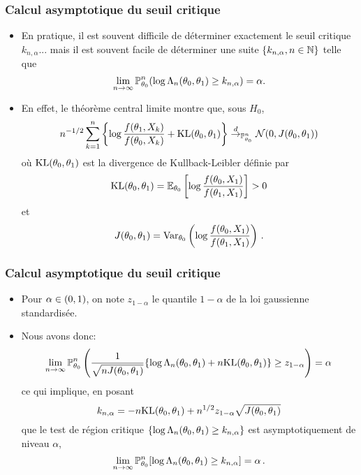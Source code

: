 \begin{frame}
\frametitle{Calcul asymptotique du seuil critique}
\begin{itemize}
\item En pratique, il est souvent difficile de déterminer exactement le seuil critique $k_{n,\alpha}$... mais il est souvent facile de déterminer
une suite $\{k_{n,\alpha}, n \in \mathbb{N}\}$ telle que
\[
\lim_{n \to \infty} \operatorname{{\mathbb P}}^n_{\theta_0} ( \log \Lambda_n(\theta_0,\theta_1) \geq  k_{n,\alpha}) = \alpha.
\]
\item En effet, le théorème central limite montre que, sous $H_0$,
\[
n^{-1/2} \sum_{k=1}^n \left\{ \log \frac{f(\theta_1,X_k)}{f(\theta_0,X_k)}  + \mathrm{KL}(\theta_0,\theta_1) \right\} \stackrel{d}{\rightarrow}_{\operatorname{{\mathbb P}}^n_{\theta_0}} \mathcal{N}(0,J(\theta_0,\theta_1))
\]
où $\mathrm{KL}(\theta_0,\theta_1)$ est la \alert{divergence de Kullback-Leibler} définie par
\[
\mathrm{KL}(\theta_0,\theta_1) = \operatorname{{\mathbb E}}_{\theta_0}\left[ \log \frac{ f(\theta_0,X_1)}{f(\theta_1,X_1)} \right] > 0
\]
et
\[
J(\theta_0,\theta_1)= \operatorname{\mathrm{Var}}_{\theta_0}\left( \log \frac{ f(\theta_0,X_1)}{f(\theta_1,X_1)} \right) \,.
\]
\end{itemize}
\end{frame}

\begin{frame}
\frametitle{Calcul asymptotique du seuil critique}
\begin{itemize}
\item Pour $\alpha \in \left(0,1\right)$, on note $z_{1-\alpha}$ le quantile $1-\alpha$ de la loi gaussienne standardisée.
\item  Nous avons donc:
\[
\lim_{n \to \infty} \operatorname{{\mathbb P}}_{\theta_0}^n \left( \frac{1}{\sqrt{n J(\theta_0,\theta_1)}} \{ \log \Lambda_n(\theta_0,\theta_1) +
  n \mathrm{KL}(\theta_0,\theta_1) \} \geq z_{1-\alpha} \right) = \alpha
\]
ce qui implique, en posant
\[
k_{n,\alpha}= -n \mathrm{KL}(\theta_0,\theta_1) + n^{1/2} z_{1-\alpha} \sqrt{J(\theta_0,\theta_1)}
\]
que le test de région critique $\{ \log \Lambda_n(\theta_0,\theta_1) \geq
k_{n,\alpha} \}$ est asymptotiquement de niveau $\alpha$,
\[
\lim_{n \to \infty} \operatorname{{\mathbb P}}^n_{\theta_0} [ \log \Lambda_n(\theta_0,\theta_1)
\geq k_{n,\alpha} ] = \alpha \,.
\]
\end{itemize}
\end{frame}

